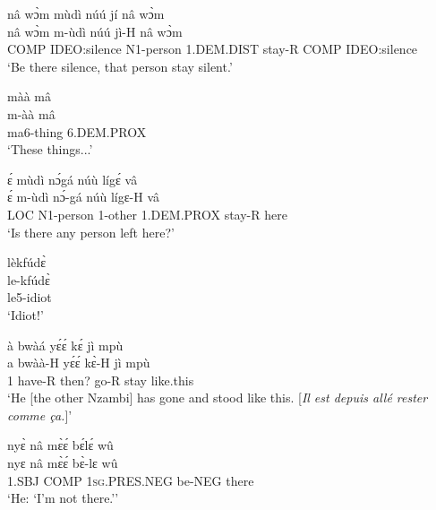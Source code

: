 \begin{exe} 
\exN\label{175}
  \glll nâ wɔ̀m mùdì núú jí nâ wɔ̀m\\
       nâ wɔ̀m m-ùdì núú jì-H nâ wɔ̀m\\
        COMP IDEO:silence N1-person 1.DEM.DIST stay-R COMP IDEO:silence\\
    \trans `Be there silence, that person stay silent.'
\end{exe}

\begin{exe} 
\exN\label{176}
  \glll màà mâ \\
      m-àà mâ \\
        ma6-thing 6.DEM.PROX \\
    \trans `These things...'
\end{exe}

\begin{exe} 
\exN\label{177}
  \glll ɛ́ mùdì nɔ́gá núù lígɛ́ vâ \\
       ɛ́ m-ùdì nɔ́-gá núù lígɛ-H vâ \\
       LOC N1-person 1-other 1.DEM.PROX stay-R here  \\
    \trans `Is there any person left here?'
\end{exe}

\begin{exe} 
\exN\label{178}
  \glll lèkfúdɛ̀  \\
        le-kfúdɛ̀  \\
       le5-idiot  \\
    \trans `Idiot!'
\end{exe}

\begin{exe} 
\exN\label{179} 
  \glll à bwàá yɛ́ɛ́ kɛ́ jì mpù \\
       a bwàà-H yɛ́ɛ́ kɛ̀-H jì mpù \\
        1 have-R then? go-R stay like.this \\
    \trans `He [the other Nzambi] has gone and stood like this. [{\itshape Il est depuis allé rester comme ça.}]'
\end{exe}

\begin{exe} 
\exN\label{180}
  \glll nyɛ̀ nâ mɛ̀ɛ́ bɛ́lɛ́ wû \\
       nyɛ nâ mɛ̀ɛ́ bɛ̀-lɛ wû \\
        1.SBJ COMP 1\textsc{sg}.PRES.NEG be-NEG there \\
    \trans `He: `I'm not there.''
\end{exe}

